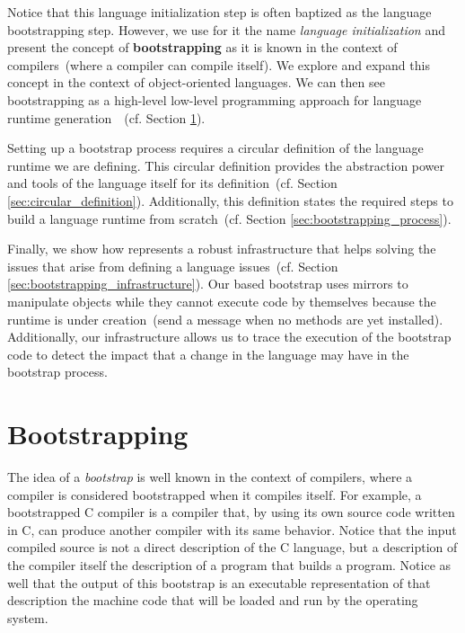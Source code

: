 Notice that this language initialization step is often baptized as the language bootstrapping step. However, we use for it the name \emph{language initialization} and present the concept of \textbf{bootstrapping} as it is known in the context of compilers~(where a compiler can compile itself). We explore and expand this concept in the context of object-oriented languages. We can then see bootstrapping as a high-level low-level programming approach for  language runtime generation~\cite{Fram09a}~(cf. Section \ref{sec:bootstrapping}).

Setting up a bootstrap process requires a circular definition of the language runtime we are defining. This circular definition provides the abstraction power and tools of the language itself for its definition~(cf. Section \ref{sec:circular_definition}). Additionally, this definition states the required steps to build a language runtime from scratch~(cf. Section \ref{sec:bootstrapping_process}).


Finally, we show how \Vtt represents a robust infrastructure that helps solving the issues that arise from defining a language issues~(cf. Section \ref{sec:bootstrapping_infrastructure}). Our \Vtt based bootstrap uses mirrors to manipulate objects while they cannot execute code by themselves because the runtime is under creation~(\eg send a message when no methods are yet installed). Additionally, our infrastructure allows us to trace the execution of the bootstrap code to detect the impact that a change in the language may have in the bootstrap process.


\section{Bootstrapping}\label{sec:bootstrapping}

The idea of a \emph{bootstrap} is well known in the context of compilers, where a compiler is considered bootstrapped when it compiles itself. For example, a bootstrapped C compiler is a compiler that, by using its own source code written in C, can produce another compiler with its same behavior. Notice that the input compiled source is not a direct description of the C language, but a description of the compiler itself \ie the description of a program that builds a program. Notice as well that the output of this bootstrap is an executable representation of that description \ie the machine code that will be loaded and run by the operating system.

